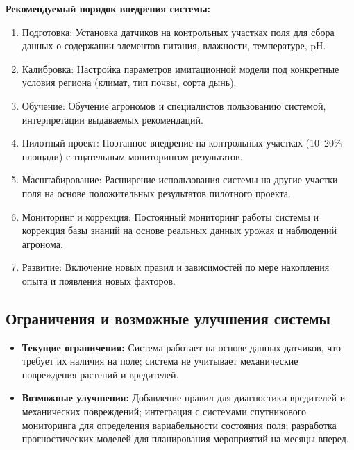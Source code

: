 \textbf{Рекомендуемый порядок внедрения системы:}
\begin{enumerate}
    \item Подготовка: Установка датчиков на контрольных участках поля для сбора данных о содержании элементов питания, влажности, температуре, pH.
    \item Калибровка: Настройка параметров имитационной модели под конкретные условия региона (климат, тип почвы, сорта дынь).
    \item Обучение: Обучение агрономов и специалистов пользованию системой, интерпретации выдаваемых рекомендаций.
    \item Пилотный проект: Поэтапное внедрение на контрольных участках (10--20\% площади) с тщательным мониторингом результатов.
    \item Масштабирование: Расширение использования системы на другие участки поля на основе положительных результатов пилотного проекта.
    \item Мониторинг и коррекция: Постоянный мониторинг работы системы и коррекция базы знаний на основе реальных данных урожая и наблюдений агронома.
    \item Развитие: Включение новых правил и зависимостей по мере накопления опыта и появления новых факторов.
\end{enumerate}

\subsection{Ограничения и возможные улучшения системы}
\begin{itemize}
    \item \textbf{Текущие ограничения:} Система работает на основе данных датчиков, что требует их наличия на поле; система не учитывает механические повреждения растений и вредителей.
    \item \textbf{Возможные улучшения:} Добавление правил для диагностики вредителей и механических повреждений; интеграция с системами спутникового мониторинга для определения вариабельности состояния поля; разработка прогностических моделей для планирования мероприятий на месяцы вперед.
\end{itemize}

